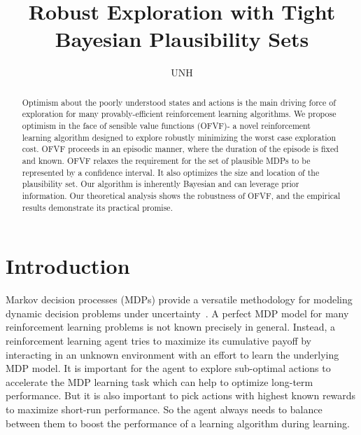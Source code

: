 \documentclass{article}
\title{Robust Exploration with Tight Bayesian Plausibility Sets}
\author{
UNH
}
\date{}
\theoremstyle{plain}
\theoremstyle{definition}
\begin{document}
\maketitle


\begin{abstract}
Optimism about the poorly understood states and actions is the main driving force of exploration for many provably-efficient reinforcement learning algorithms. We propose optimism in the face of sensible value functions (OFVF)- a novel reinforcement learning algorithm designed to explore robustly minimizing the worst case exploration cost. OFVF proceeds in an episodic manner, where the duration of the episode is fixed and known. OFVF relaxes the requirement for the set of plausible MDPs to be represented by a confidence interval. It also optimizes the size and location of the plausibility set. Our algorithm is inherently Bayesian and can leverage prior information. Our theoretical analysis shows the robustness of OFVF, and the empirical results demonstrate its practical promise.
\end{abstract}

\section{Introduction}

Markov decision processes (MDPs) provide a versatile methodology for modeling dynamic decision problems under uncertainty~\citep{Bertsekas1996,Sutton1998,Puterman2005}. A perfect MDP model for many reinforcement learning problems is not known precisely in general. Instead, a reinforcement learning agent tries to maximize its cumulative payoff by interacting in an unknown environment with an effort to learn the underlying MDP model. It is important for the agent to explore
sub-optimal actions to accelerate the MDP learning task which can help to optimize long-term performance. But it is also important to pick actions with highest known rewards to maximize short-run performance. So the agent always needs to balance between them to boost the performance of a learning algorithm during learning. 
\end{document}
